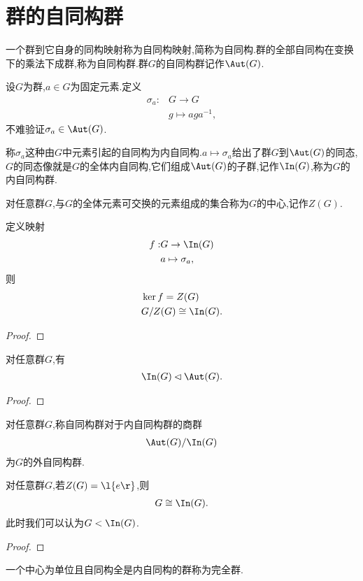 \section{群的自同构群}
\begin{definition}[自同构与自同构群]
    一个群到它自身的同构映射称为自同构映射,简称为自同构.群的全部自同构在变换下的乘法下成群,称为自同构群.群$G$的自同构群记作$\Aut(G)$.
\end{definition}
设$G$为群,$a\in G$为固定元素.定义\begin{align}
    \sigma_a:&G\to G\nonumber\\
    &g\mapsto aga^{-1}\nonumber,
\end{align}不难验证$\sigma_a\in\Aut(G)$.
\begin{definition}[内自同构与内自同构群]
    称$\sigma_a$这种由$G$中元素引起的自同构为内自同构.$a\mapsto\sigma_a$给出了群$G$到$\Aut(G)$的同态,$G$的同态像就是$G$的全体内自同构,它们组成$\Aut(G)$的子群,记作$\In(G)$,称为$G$的内自同构群.
\end{definition}
\begin{definition}[中心]
    对任意群$G$,与$G$的全体元素可交换的元素组成的集合称为$G$的中心,记作$Z(G)$.
\end{definition}
\begin{theorem}
    定义映射\begin{align*}
        f:&G\to\In(G)\\
        &a\mapsto\sigma_a,
    \end{align*}则\begin{align*}
        &\ker f=Z(G)\\
        &G/Z(G)\cong\In(G).
    \end{align*}
\end{theorem}
\begin{proof}
    \stars
\end{proof}
\begin{theorem}
    对任意群$G$,有\begin{align*}
        \In(G)\lhd\Aut(G).
    \end{align*}
\end{theorem}
\begin{proof}
    \stars
\end{proof}
\begin{definition}[外自同构群]
    对任意群$G$,称自同构群对于内自同构群的商群\begin{align*}
        \Aut(G)/\In(G)
    \end{align*}为$G$的外自同构群.
\end{definition}
\begin{theorem}
    对任意群$G$,若$Z(G)=\l\{e\r\}$,则\begin{align*}
        G\cong\In(G).
    \end{align*}此时我们可以认为$G<\In(G)$.
\end{theorem}
\begin{proof}
    \stars
\end{proof}
\begin{definition}[完全群]
    一个中心为单位且自同构全是内自同构的群称为完全群.
\end{definition}

